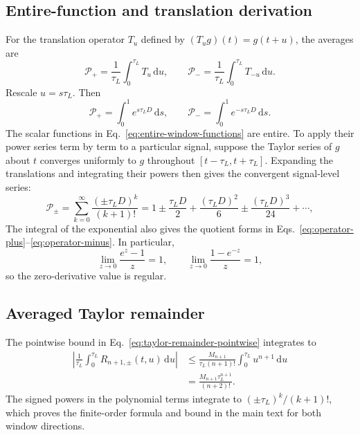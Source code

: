 \documentclass[12pt]{article}
\begin{document}
\subsection{Entire-function and translation derivation}

For the translation operator $T_u$ defined by $(T_ug)(t)=g(t+u)$, the averages are
\begin{equation}
  \mathcal{P}_{+}=\frac{1}{\tau_L}\int_0^{\tau_L}T_u\,\mathrm{d}u,
  \qquad
  \mathcal{P}_{-}=\frac{1}{\tau_L}\int_0^{\tau_L}T_{-u}\,\mathrm{d}u.
  \label{eq:appendix-translation-integrals}
\end{equation}
Rescale $u=s\tau_L$. Then
\begin{equation}
  \mathcal{P}_{+}=\int_0^1e^{s\tau_LD}\,\mathrm{d}s,
  \qquad
  \mathcal{P}_{-}=\int_0^1e^{-s\tau_LD}\,\mathrm{d}s.
  \label{eq:appendix-entire-integrals}
\end{equation}
The scalar functions in Eq.~\eqref{eq:entire-window-functions} are entire. To apply their power series term by term to a particular signal, suppose the Taylor series of $g$ about $t$ converges uniformly to $g$ throughout $[t-\tau_L,t+\tau_L]$. Expanding the translations and integrating their powers then gives the convergent signal-level series:
\begin{equation}
  \mathcal{P}_{\pm}
  =\sum_{k=0}^{\infty}\frac{(\pm\tau_LD)^k}{(k+1)!}
  =1\pm\frac{\tau_LD}{2}
   +\frac{(\tau_LD)^2}{6}
   \pm\frac{(\tau_LD)^3}{24}+\cdots,
  \label{eq:appendix-operator-series}
\end{equation}
The integral of the exponential also gives the quotient forms in Eqs.~\eqref{eq:operator-plus}--\eqref{eq:operator-minus}. In particular,
\begin{equation}
  \lim_{z\to0}\frac{e^z-1}{z}=1,
  \qquad
  \lim_{z\to0}\frac{1-e^{-z}}{z}=1,
  \label{eq:appendix-removable-limits}
\end{equation}
so the zero-derivative value is regular.

\subsection{Averaged Taylor remainder}

The pointwise bound in Eq.~\eqref{eq:taylor-remainder-pointwise} integrates to
\begin{align}
  \left|\frac{1}{\tau_L}\int_0^{\tau_L}
      R_{n+1,\pm}(t,u)\,\mathrm{d}u\right|
  &\leq\frac{M_{n+1}}{\tau_L(n+1)!}
      \int_0^{\tau_L}u^{n+1}\,\mathrm{d}u \\
  &=\frac{M_{n+1}\tau_L^{n+1}}{(n+2)!}.
  \label{eq:appendix-remainder-integral}
\end{align}
The signed powers in the polynomial terms integrate to $(\pm\tau_L)^k/(k+1)!$, which proves the finite-order formula and bound in the main text for both window directions.
\end{document}
